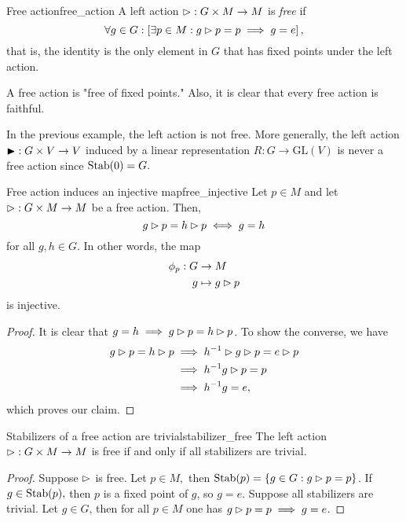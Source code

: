 \begin{definition}{Free action}{free_action}
    A left action \(\mathbin{\vartriangleright} : G \times M \to M\) is \emph{free} if
    \begin{equation*}
        \forall g \in G : \left[\exists p \in M : g \mathbin{\vartriangleright} p = p \implies g = e\right],
    \end{equation*}
    that is, the identity is the only element in \(G\) that has fixed points under the left action.
\end{definition}
\begin{remark}
    A free action is "free of fixed points." Also, it is clear that every free action is faithful.
\end{remark}
\begin{example}
    In the previous example, the left action is not free. More generally, the left action \(\mathbin{\blacktriangleright} : G \times V \to V\) induced by a linear representation \(R : G \to \mathrm{GL}(V)\) is never a free action since \(\operatorname{Stab}(0) = G.\)
\end{example}

\begin{lemma}{Free action induces an injective map}{free_injective}
    Let \(p \in M\) and let \(\mathbin{\vartriangleright} : G \times M \to M\) be a free action. Then,
    \begin{equation*}
        g \mathbin{\vartriangleright} p = h \mathbin{\vartriangleright} p \iff g = h
    \end{equation*}
    for all \(g, h \in G\). In other words, the map
    \begin{align*}
        \phi_p : G &\to M\\
                 g &\mapsto g \mathbin{\vartriangleright} p
    \end{align*}
    is injective.
\end{lemma}
\begin{proof}
    It is clear that \(g = h \implies g \mathbin{\vartriangleright} p = h \mathbin{\vartriangleright} p\). To show the converse, we have
    \begin{align*}
        g \mathbin{\vartriangleright} p = h \mathbin{\vartriangleright} p &\implies h^{-1} \mathbin{\vartriangleright} g \mathbin{\vartriangleright} p = e \mathbin{\vartriangleright} p\\
                              &\implies h^{-1}g \mathbin{\vartriangleright} p = p\\
                              &\implies h^{-1}g = e,
    \end{align*}
    which proves our claim.
\end{proof}

\begin{proposition}{Stabilizers of a free action are trivial}{stabilizer_free}
    The left action \(\mathbin{\vartriangleright} : G \times M \to M\) is free if and only if all stabilizers are trivial.
\end{proposition}
\begin{proof}
    Suppose \(\mathbin{\vartriangleright}\) is free. Let \(p \in M,\) then \(\operatorname{Stab}(p) = \{g \in G : g \mathbin{\vartriangleright} p = p\}\). If \(g \in \operatorname{Stab}(p),\) then \(p\) is a fixed point of \(g\), so \(g = e.\) Suppose all stabilizers are trivial. Let \(g \in G\), then for all \(p \in M\) one has \(g \mathbin{\vartriangleright} p = p \implies g = e\).
\end{proof}

